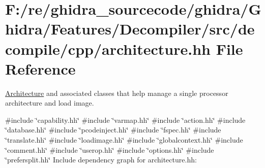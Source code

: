 \hypertarget{architecture_8hh}{}\section{F\+:/re/ghidra\+\_\+sourcecode/ghidra/\+Ghidra/\+Features/\+Decompiler/src/decompile/cpp/architecture.hh File Reference}
\label{architecture_8hh}


\mbox{\hyperlink{class_architecture}{Architecture}} and associated classes that help manage a single processor architecture and load image.  


{\ttfamily \#include \char`\"{}capability.\+hh\char`\"{}}\newline
{\ttfamily \#include \char`\"{}varmap.\+hh\char`\"{}}\newline
{\ttfamily \#include \char`\"{}action.\+hh\char`\"{}}\newline
{\ttfamily \#include \char`\"{}database.\+hh\char`\"{}}\newline
{\ttfamily \#include \char`\"{}pcodeinject.\+hh\char`\"{}}\newline
{\ttfamily \#include \char`\"{}fspec.\+hh\char`\"{}}\newline
{\ttfamily \#include \char`\"{}translate.\+hh\char`\"{}}\newline
{\ttfamily \#include \char`\"{}loadimage.\+hh\char`\"{}}\newline
{\ttfamily \#include \char`\"{}globalcontext.\+hh\char`\"{}}\newline
{\ttfamily \#include \char`\"{}comment.\+hh\char`\"{}}\newline
{\ttfamily \#include \char`\"{}userop.\+hh\char`\"{}}\newline
{\ttfamily \#include \char`\"{}options.\+hh\char`\"{}}\newline
{\ttfamily \#include \char`\"{}prefersplit.\+hh\char`\"{}}\newline
Include dependency graph for architecture.\+hh\+:
\nopagebreak
